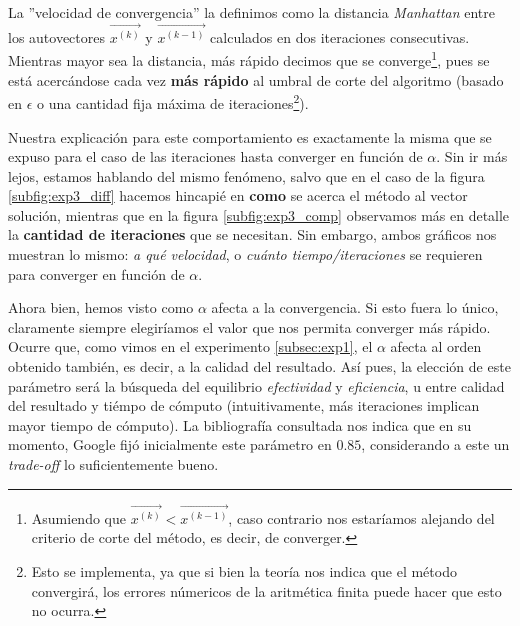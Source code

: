 \par La ''velocidad de convergencia'' la definimos como la distancia
\emph{Manhattan} entre los autovectores $\vec{x^{(k)}}$ y $\vec{x^{(k-1)}}$
calculados en dos iteraciones consecutivas. Mientras mayor sea la distancia,
m\'as r\'apido decimos que se converge\footnote{Asumiendo que $\vec{x^{(k)}} <
\vec{x^{(k-1)}}$, caso contrario nos estar\'iamos alejando del criterio de corte
del m\'etodo, es decir, de converger.}, pues se est\'a acerc\'andose cada vez
\textbf{m\'as rápido} al umbral de corte del algoritmo (basado en $\epsilon$ o
una cantidad fija m\'axima de iteraciones\footnote{Esto se implementa, ya que si
bien la teor\'ia nos indica que el m\'etodo convergir\'a, los errores
n\'umericos de la aritm\'etica finita puede hacer que esto no ocurra.}).

\par Nuestra explicaci\'on para este comportamiento es exactamente la misma que
se expuso para el caso de las iteraciones hasta converger en funci\'on de
$\alpha$. Sin ir m\'as lejos, estamos hablando del mismo fen\'omeno, salvo que
en el caso de la figura \ref{subfig:exp3_diff} hacemos hincapi\'e en
\textbf{como} se acerca el m\'etodo al vector soluci\'on, mientras que en la figura
\ref{subfig:exp3_comp} observamos m\'as en detalle la \textbf{cantidad de
iteraciones} que se necesitan. Sin embargo, ambos gr\'aficos nos muestran lo
mismo: \textit{a qué velocidad}, o \textit{cuánto tiempo/iteraciones} se
requieren para converger en funci\'on de $\alpha$.

\par Ahora bien, hemos visto como $\alpha$ afecta a la convergencia. Si esto
fuera lo \'unico, claramente siempre elegir\'iamos el valor que nos permita
converger m\'as r\'apido. Ocurre que, como vimos en el experimento
\ref{subsec:exp1}, el $\alpha$ afecta al orden obtenido tambi\'en, es decir, a
la calidad del resultado. As\'i pues, la elecci\'on de este par\'ametro ser\'a
la b\'usqueda del equilibrio \emph{efectividad} y \emph{eficiencia}, u entre
calidad del resultado y ti\'empo de c\'omputo (intuitivamente, m\'as iteraciones
implican mayor tiempo de c\'omputo). La bibliograf\'ia consultada nos indica que
en su momento, Google fij\'o inicialmente este par\'ametro en $0.85$,
considerando a este un \emph{trade-off} lo suficientemente
bueno\cite{Bryan2006}\cite{Langville2006}.

